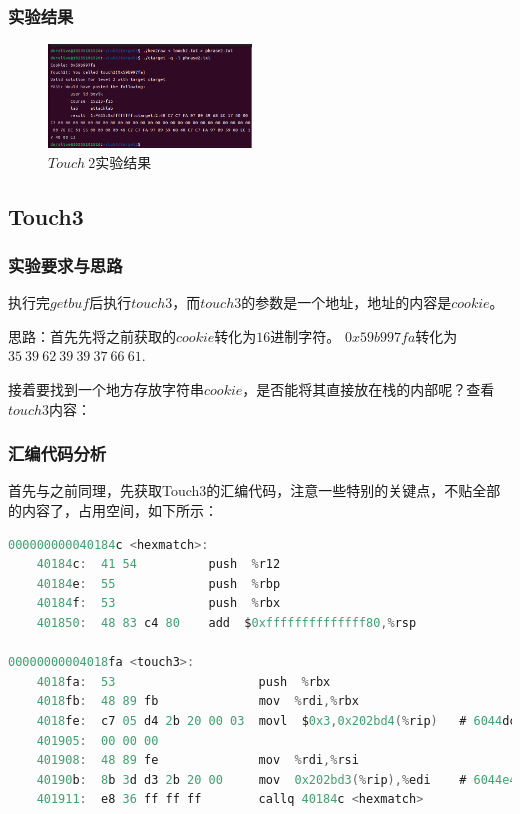 \subsubsection{实验结果}
\begin{figure} [H]
    \centering
    \includegraphics[width=0.48\textwidth]{Touch2.png}
    \caption{$Touch\ 2$实验结果}
\end{figure}

\subsection{Touch3}

\subsubsection{实验要求与思路}
执行完$getbuf$后执行$touch3$，而$touch3$的参数是一个地址，地址的内容是$cookie$。

思路：首先先将之前获取的$cookie$转化为$16$进制字符。
$0x59b997fa$转化为$35\ 39\ 62\ 39\ 39\ 37\ 66\ 61$.

接着要找到一个地方存放字符串$cookie$，是否能将其直接放在栈的内部呢？查看$touch3$内容：

\subsubsection{汇编代码分析}
首先与之前同理，先获取Touch3的汇编代码，注意一些特别的关键点，不贴全部的内容了，占用空间，如下所示：
\begin{lstlisting}[language = C , title = {Touch3.s} ]
000000000040184c <hexmatch>:
    40184c:  41 54          push  %r12
    40184e:  55             push  %rbp
    40184f:  53             push  %rbx
    401850:  48 83 c4 80    add  $0xffffffffffffff80,%rsp

00000000004018fa <touch3>:
    4018fa:  53                    push  %rbx
    4018fb:  48 89 fb              mov  %rdi,%rbx
    4018fe:  c7 05 d4 2b 20 00 03  movl  $0x3,0x202bd4(%rip)   # 6044dc <vlevel>
    401905:  00 00 00 
    401908:  48 89 fe              mov  %rdi,%rsi
    40190b:  8b 3d d3 2b 20 00     mov  0x202bd3(%rip),%edi    # 6044e4 <cookie>
    401911:  e8 36 ff ff ff        callq 40184c <hexmatch>      
\end{lstlisting}

